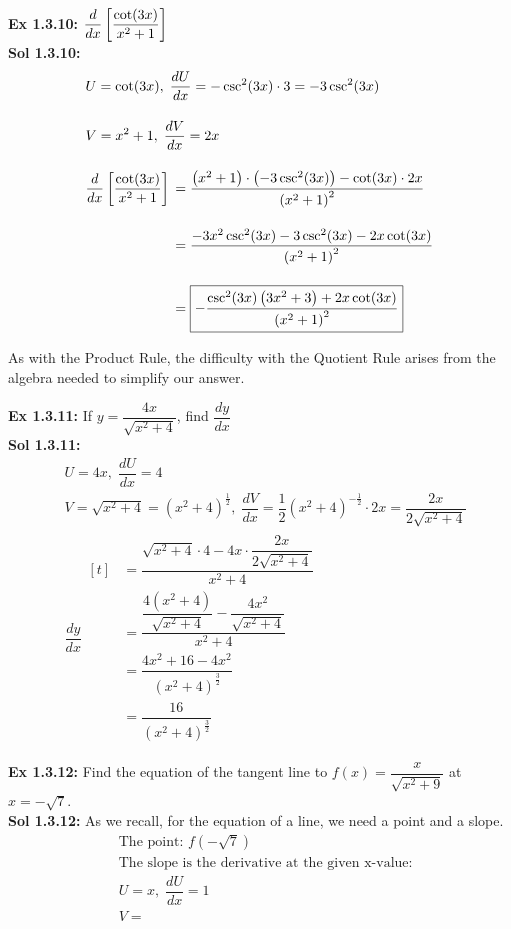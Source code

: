 \textbf{Ex 1.3.10: } $\dfrac{d}{dx} \left[\dfrac{\cot (3x)}{x^2 + 1}\right]$ \\[11pt]
\textbf{Sol 1.3.10: } \begin{align*}
    & U = \cot (3x), \; \dfrac{dU}{dx} = -\csc^2 (3x) \cdot 3 = -3\csc^2 (3x)\\[11pt]
    & V = x^2 + 1, \; \dfrac{dV}{dx} = 2x \\[11pt]
    & \dfrac{d}{dx} \left[\dfrac{\cot (3x)}{x^2 + 1}\right] \begin{aligned}[t]
        & = \dfrac{\left(x^2 + 1\right) \cdot \left(-3\csc^2 (3x)\right) - \cot (3x) \cdot 2x}{\left(x^2 + 1\right)^2} \\[11pt]
        & = \dfrac{-3x^2\csc^2 (3x) - 3\csc^2 (3x) - 2x\cot (3x)}{\left(x^2 + 1\right)^2} \\[11pt]
        & = \boxed{-\dfrac{\csc^{2}(3x)\left(3x^2 + 3\right) + 2x \cot(3x)}{\left(x^2 + 1\right)^2}}
    \end{aligned}
\end{align*}

As with the Product Rule, the difficulty with the Quotient Rule arises from the algebra needed to simplify our answer. \par

\textbf{Ex 1.3.11: } If $y = \dfrac{4x}{\sqrt{x^2 + 4}}$, find $\dfrac{dy}{dx}$ \\[11pt]
\textbf{Sol 1.3.11: } \begin{align*}
    & U = 4x, \; \dfrac{dU}{dx} = 4 \\[11pt]
    & V = \sqrt{x^2 + 4} = \left(x^2 + 4\right)^\frac{1}{2}, \; \dfrac{dV}{dx} = \dfrac{1}{2}\left(x^2 + 4\right)^{-\frac{1}{2}} \cdot 2x = \dfrac{2x}{2\sqrt{x^2 + 4}} \\[11pt]
    & \dfrac{dy}{dx} \begin{aligned}[t]
        & = \dfrac{\sqrt{x^2 + 4} \cdot 4 - 4x \cdot \dfrac{2x}{2\sqrt{x^2 + 4}}}{x^2 + 4} \\[11pt]
        & = \dfrac{\dfrac{4\left(x^2 + 4\right)}{\sqrt{x^2 + 4}} - \dfrac{4x^2}{\sqrt{x^2 + 4}}}{x^2 + 4} \\[11pt]
        & = \dfrac{4x^2 + 16 - 4x^2}{\left(x^2 + 4\right)^\frac{3}{2}} \\[11pt]
        & = \boxed{\dfrac{16}{\left(x^2 + 4\right)^\frac{3}{2}}}
    \end{aligned}
\end{align*}

\textbf{Ex 1.3.12: } Find the equation of the tangent line to $f(x) = \dfrac{x}{\sqrt{x^2 + 9}}$ at $x = -\sqrt{7}$. \\[11pt]
\textbf{Sol 1.3.12: } As we recall, for the equation of a line, we need a point and a slope. \begin{align*}
    & \text{The point: } f\left(-\sqrt{7}\right) \\[11pt]
    & \text{The slope is the derivative at the given x-value:} \\[11pt]
    & U = x, \; \dfrac{dU}{dx} = 1 \\[11pt]
    & V = 
\end{align*} 

